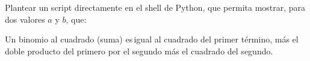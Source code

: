 Plantear un script directamente en el shell de Python, que permita mostrar, para dos valores $a$ y $b$, que:  

Un binomio al cuadrado (suma) es igual al cuadrado del primer término, más el doble producto del primero por el segundo más el cuadrado del segundo. 
